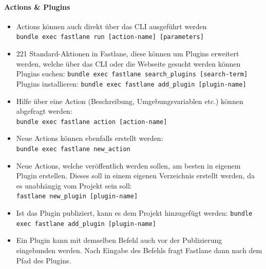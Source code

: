 \documentclass[a4paper]{article}
\begin{document}
		\paragraph{Actions \& Plugins}
		\begin{itemize}
			\item Actions können auch direkt über das CLI ausgeführt werden\\
				\texttt{bundle exec fastlane run [action-name] [parameters]}
			\item 221 Standard-Aktionen in Fastlane, diese können um Plugins erweitert werden, welche über das CLI oder die Webseite gesucht werden können \\
				Plugins suchen: \texttt{bundle exec fastlane search\_plugins [search-term]} \\
				Plugins installieren: \texttt{bundle exec fastlane add\_plugin [plugin-name]}
			\item Hilfe über eine Action (Beschreibung, Umgebungsvariablen etc.) können abgefragt werden: \\
				\texttt{bundle exec fastlane action [action-name]}
			\item Neue Actions können ebenfalls erstellt werden: \\
				\texttt{bundle exec fastlane new\_action}
			\item Neue Actions, welche veröffentlich werden sollen, am besten in eigenem Plugin erstellen. 
				Dieses soll in einem eigenen Verzeichnis erstellt werden, da es unabhängig vom Projekt sein soll: \\
				\texttt{fastlane new\_plugin [plugin-name]}
			\item Ist das Plugin publiziert, kann es dem Projekt hinzugefügt werden:
				\texttt{bundle exec fastlane add\_plugin [plugin-name]}
			\item Ein Plugin kann mit demselben Befehl auch vor der Publizierung eingebunden werden.
				Nach Eingabe des Befehls fragt Fastlane dann nach dem Pfad des Plugins.
		\end{itemize}
	
\end{document}
